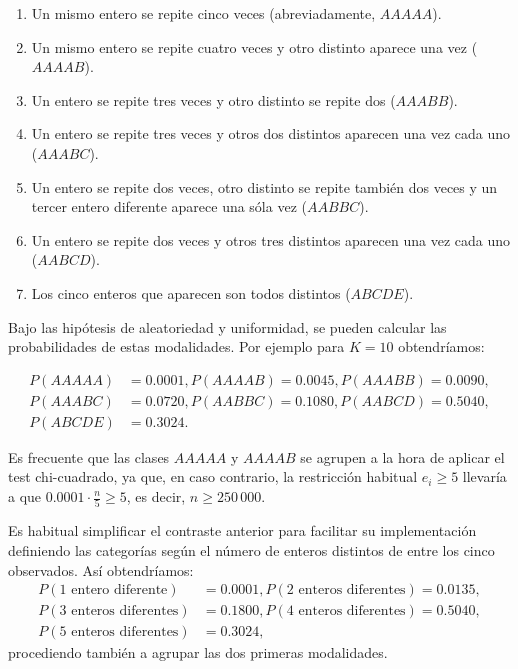 \documentclass[
  spanish,
  10pt,
]{book}
\theoremstyle{break}
\theoremstyle{nonumberplain}
\begin{document}
\begin{enumerate}
\def\labelenumi{\arabic{enumi}.}
\item
  Un mismo entero se repite cinco veces (abreviadamente, \(AAAAA\)).
\item
  Un mismo entero se repite cuatro veces y otro distinto aparece una
  vez (\(AAAAB\)).
\item
  Un entero se repite tres veces y otro distinto se repite dos
  (\(AAABB\)).
\item
  Un entero se repite tres veces y otros dos distintos aparecen una
  vez cada uno (\(AAABC\)).
\item
  Un entero se repite dos veces, otro distinto se repite también dos
  veces y un tercer entero diferente aparece una sóla vez (\(AABBC\)).
\item
  Un entero se repite dos veces y otros tres distintos aparecen una
  vez cada uno (\(AABCD\)).
\item
  Los cinco enteros que aparecen son todos distintos (\(ABCDE\)).
\end{enumerate}

Bajo las hipótesis de aleatoriedad y uniformidad, se pueden calcular las probabilidades de estas modalidades. Por ejemplo para \(K=10\) obtendríamos:

\[\begin{aligned}
P(AAAAA) & =0.0001, P(AAAAB)=0.0045, P(AAABB)=0.0090,\\
P(AAABC) & =0.0720, P(AABBC)=0.1080, P(AABCD)=0.5040,\\
P(ABCDE) & =0.3024.
\end{aligned}\]

Es frecuente que las clases \(AAAAA\) y \(AAAAB\) se agrupen a la hora de
aplicar el test chi-cuadrado, ya que, en caso contrario, la restricción
habitual \(e_{i}\geq5\) llevaría a que \(0.0001\cdot\frac{n}{5}\geq5\), es
decir, \(n\geq250\,000\).

Es habitual simplificar el contraste anterior para facilitar su implementación definiendo las categorías según el número de enteros distintos de entre los cinco observados.
Así obtendríamos:
\[\begin{aligned}
P(\text{1 entero diferente}) & = 0.0001,
P(\text{2 enteros diferentes}) = 0.0135,\\
P(\text{3 enteros diferentes}) & = 0.1800, 
P(\text{4 enteros diferentes}) = 0.5040,\\
P(\text{5 enteros diferentes}) & = 0.3024,
\end{aligned}\]
procediendo también a agrupar las dos primeras modalidades.
\end{document}
